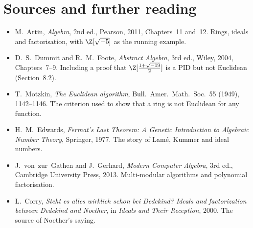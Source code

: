 \section*{Sources and further reading}

\begin{itemize}
\item M.~Artin, \emph{Algebra}, 2nd ed., Pearson, 2011, Chapters~11 and~12. Rings, ideals and factorisation, with $\Z[\sqrt{-5}]$ as the running example.
\item D.~S.~Dummit and R.~M.~Foote, \emph{Abstract Algebra}, 3rd ed., Wiley, 2004, Chapters~7--9. Including a proof that $\Z[\frac{1+\sqrt{-19}}2]$ is a PID but not Euclidean (Section~8.2).
\item T.~Motzkin, \emph{The Euclidean algorithm}, Bull.\ Amer.\ Math.\ Soc.\ 55 (1949), 1142--1146. The criterion used to show that a ring is not Euclidean for any function.
\item H.~M.~Edwards, \emph{Fermat's Last Theorem: A Genetic Introduction to Algebraic Number Theory}, Springer, 1977. The story of Lamé, Kummer and ideal numbers.
\item J.~von~zur~Gathen and J.~Gerhard, \emph{Modern Computer Algebra}, 3rd ed., Cambridge University Press, 2013. Multi-modular algorithms and polynomial factorisation.
\item L.~Corry, \emph{Steht es alles wirklich schon bei Dedekind? Ideals and factorization between Dedekind and Noether}, in \emph{Ideals and Their Reception}, 2000. The source of Noether's saying.
\end{itemize}
